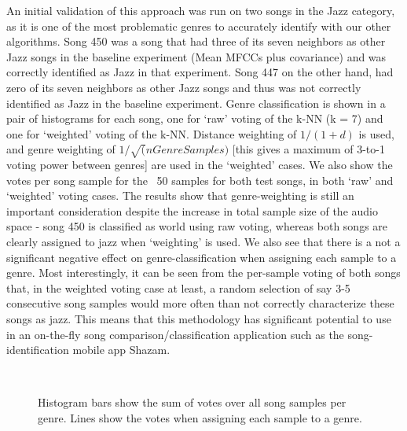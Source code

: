 \documentclass[10pt]{article}
\begin{document}
An initial validation of this approach was run on two songs in the Jazz category, as it is one of the most problematic genres to accurately identify with our other algorithms.  Song 450 was a song that had three of its seven neighbors as other Jazz songs in the baseline experiment (Mean MFCCs plus covariance) and was correctly identified as Jazz in that experiment.  Song 447 on the other hand, had zero of its seven neighbors as other Jazz songs and thus was not correctly identified as Jazz in the baseline experiment.  Genre classification is shown in a pair of histograms for each song, one for ‘raw’ voting of the k-NN (k = 7) and one for ‘weighted’ voting of the k-NN.  Distance weighting of $1 / (1 + d)$ is used, and genre weighting of $1 / \sqrt(nGenreSamples)$ [this gives a maximum of 3-to-1 voting power between genres] are used in the ‘weighted’ cases.   We also show the votes per song sample for the ~50 samples for both test songs, in both ‘raw’ and ‘weighted’ voting cases.  The results show that genre-weighting is still an important consideration despite the increase in total sample size of the audio space - song 450 is classified as world using raw voting, whereas both songs are clearly assigned to jazz when ‘weighting’ is used.  We also see that there is a not a significant negative effect on genre-classification when assigning each sample to a genre.  Most interestingly, it can be seen from the per-sample voting of both songs that, in the weighted voting case at least, a random selection of say 3-5 consecutive song samples would more often than not correctly characterize these songs as jazz.  This means that this methodology has significant potential to use in an on-the-fly song comparison/classification application such as the song-identification mobile app Shazam.

\begin{figure}[h!]
\\
\caption{Histogram bars show the sum of votes over all song samples per genre.  Lines show the votes when assigning each sample to a genre.}
\label{fig:fivesecond_song_histogram}
\end{figure}
\end{document}
